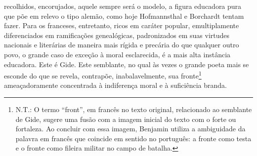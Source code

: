 recolhidos, encorujados, aquele sempre será o modelo, a figura educadora
pura que põe em relevo o tipo alemão, como hoje Hofmannsthal e Borchardt
tentam fazer. Para os franceses, entretanto, ricos em caráter popular,
emultiplamente diferenciados em ramificações genealógicas, padronizados
em suas virtudes nacionais e literárias de maneira mais rígida e
precária do que qualquer outro povo, o grande caso de exceção à moral
esclarecida, é a mais alta instância educadora. Este é Gide. Este
semblante, no qual às vezes o grande poeta mais se esconde do que se
revela, contrapõe, inabalavelmente, sua fronte\footnote{N.T.: O termo
  ``front'', em francês no texto original, relacionado ao semblante de
  Gide, sugere uma fusão com a imagem inicial do texto com o forte ou
  fortaleza. Ao concluir com essa imagem, Benjamin utiliza a ambiguidade
  da palavra em francês que coincide em sentido no português: a fronte
  como testa e o fronte como fileira militar no campo de batalha.}
ameaçadoramente concentrada à indiferença moral e à suficiência branda.
